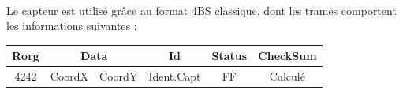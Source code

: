 \paragraph{}
Le capteur est utilisé grâce au format 4BS classique, dont les trames comportent les informations suivantes : 

\begin{center}
\begin{tabular}{|c|c|c|c|c|c|}
\hline
Rorg&\multicolumn{2}{|c|}{Data}&Id&Status&CheckSum\\
\hline
4242&CoordX&CoordY&Ident.Capt&FF&Calculé\\
\hline
\end{tabular}
\end{center}
 

